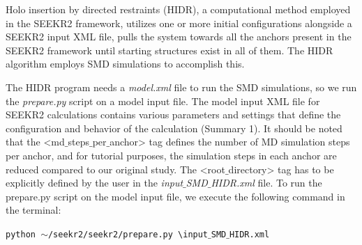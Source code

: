 \documentclass[9pt,training,pubversion]{livecoms}
\begin{document}
\noindent Holo insertion by directed restraints (HIDR), a computational method employed in the SEEKR2 framework, utilizes one or more initial configurations alongside a SEEKR2 input XML file, pulls the system towards all the anchors present in the SEEKR2 framework until starting structures exist in all of them. The HIDR algorithm employs SMD simulations to accomplish this. \par

\noindent The HIDR program needs a \textit{model.xml} file to run the SMD simulations, so we run the \textit{prepare.py} script on a model input file. The model input XML file for SEEKR2 calculations contains various parameters and settings that define the configuration and behavior of the calculation (Summary 1).  It should be noted that the <md$\_$steps$\_$per$\_$anchor> tag defines the number of MD simulation steps per anchor, and for tutorial purposes, the simulation steps in each anchor are reduced compared to our original study. The <root$\_$directory> tag has to be explicitly defined by the user in the \textit{input$\_$SMD$\_$HIDR.xml} file. To run the prepare.py script on the model input file, we execute the following command in the terminal:

\begin{tcolorbox}[colback=black!8!white, colframe=black!50!black, fontlower=\tiny, left=2pt, right=2pt, top=2pt, bottom=2pt] 
\texttt{python $\sim$/seekr2/seekr2/prepare.py \textbackslash \linebreak input$\_$SMD$\_$HIDR.xml}
\end{tcolorbox}
\end{document}
